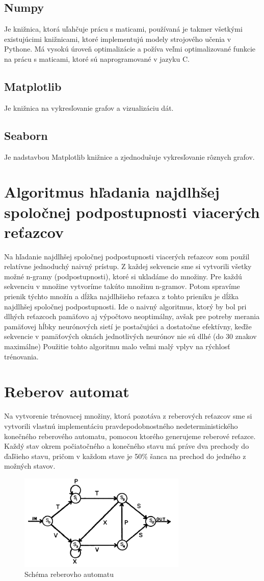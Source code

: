 \subsection{Numpy}
Je knižnica, ktorá uľahčuje prácu s maticami, používaná je takmer všetkými existujúcimi
knižnicami, ktoré implementujú modely strojového učenia v Pythone. Má vysokú úroveň optimalizácie
a požíva veľmi optimalizované funkcie na prácu s maticami, ktoré sú naprogramované v jazyku C.
\subsection{Matplotlib}
Je knižnica na vykresľovanie grafov a vizualizáciu dát.
\subsection{Seaborn}
Je nadstavbou Matplotlib knižnice a zjednodušuje vykresľovanie rôznych grafov.

\section{Algoritmus hľadania najdlhšej spoločnej podpostupnosti viacerých reťazcov}
Na hľadanie najdlhšej spoločnej podpostupnosti viacerých reťazcov som použil relatívne jednoduchý naivný prístup. 
Z každej sekvencie sme si vytvorili všetky možné n-gramy (podpostupnosti), ktoré si ukladáme do množiny.
Pre každú sekvenciu v množine vytvoríme takúto množinu n-gramov. Potom spravíme prienik týchto množín a dĺžka najdlhšieho 
reťazca z tohto prieniku je dĺžka najdlhšej spoločnej podpostupnosti. Ide o naivný algoritmus, ktorý by bol pri
dlhých reťazcoch pamäťovo aj výpočtovo neoptimálny, avšak pre potreby merania pamäťovej hĺbky neurónových sietí
je postačujúci a dostatočne efektívny, keďže sekvencie v pamäťových oknách 
jednotlivých neurónov nie sú dlhé (do 30 znakov maximálne)
Použitie tohto algoritmu malo veľmi malý vplyv na rýchlosť trénovania.

\section{Reberov automat}
Na vytvorenie trénovacej množiny, ktorá pozotáva z reberových reťazcov sme si vytvorili vlastnú implementáciu pravdepodobnostného nedeterministického
konečného reberového automatu, pomocou ktorého generujeme reberové reťazce.
Každý stav okrem počiatočného a konečného stavu má práve dva prechody do ďaľšieho stavu, 
pričom v každom stave je 50\% šanca na prechod do jedného z možných stavov.
\begin{figure}[H]
    \centering
    \includegraphics[width=8cm]{assets/reber}
    \caption{Schéma reberovho automatu}
\end{figure}
